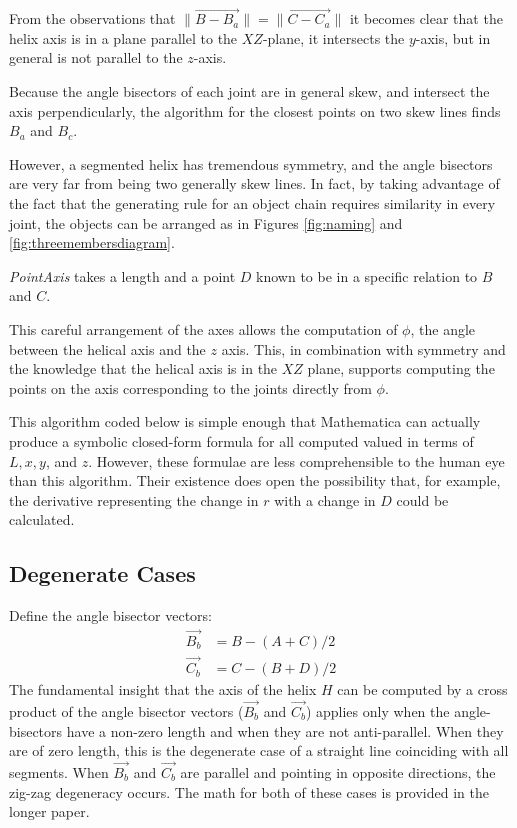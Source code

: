 \documentclass{svproc}
\begin{document}
From the observations that $\| \overrightarrow{B - B_a} \| = \| \overrightarrow{C - C_a} \|$
it becomes clear that the helix axis is in a plane
parallel to the $XZ$-plane, it intersects the $y$-axis, but in general is
not parallel to the $z$-axis.

Because the angle bisectors of each joint are in general skew, and intersect the
axis perpendicularly, the algorithm
for the closest points on two skew lines finds $B_a$ and $B_c$.

However, a segmented helix has
tremendous symmetry, and the angle bisectors are very far from being two
generally skew lines. In fact, by taking advantage of the fact that the
generating rule for an object chain requires similarity in every joint,
the objects can be arranged as in Figures \ref{fig:naming} and \ref{fig:threemembersdiagram}.

{\em PointAxis} takes a length and a point $D$ known to be in
a specific relation to $B$ and $C$.

This careful arrangement of the axes
allows the computation of $\phi$, the angle between the helical axis
and the $z$ axis. This, in combination with symmetry and the knowledge
that the helical axis is in the $XZ$ plane, supports computing the
points on the axis corresponding to the joints directly from $\phi$.

This algorithm coded below is simple enough that Mathematica\cite{Mathematica} can
actually produce a symbolic closed-form formula for all computed valued
in terms of $L, x, y$, and $z$.
However, these formulae are less comprehensible to the
human eye than this algorithm.
Their existence does open
the possibility that, for example, the derivative representing
the change in $r$ with a change in $D$ could be calculated.

\subsection{Degenerate Cases}

Define the angle bisector vectors:
\begin{align}
  \overrightarrow{B_b} &= B - (A + C)/2 \\
  \overrightarrow{C_b} &= C - (B + D)/2
  \end{align}
The fundamental insight that the axis of the helix $H$ can be
computed by a cross product of the angle bisector
vectors ($\overrightarrow{B_b}$ and $\overrightarrow{C_b}$) applies only
when the angle-bisectors have a non-zero length and when
they are not anti-parallel. When they are of zero length, this is
the degenerate case of a straight line coinciding with all segments.
When $\overrightarrow{B_b}$ and $\overrightarrow{C_b}$ are parallel and pointing in opposite directions,
the zig-zag degeneracy occurs.
The math for both of these cases is provided in the longer paper\cite{readfullsegmentedhelix}.
\end{document}
